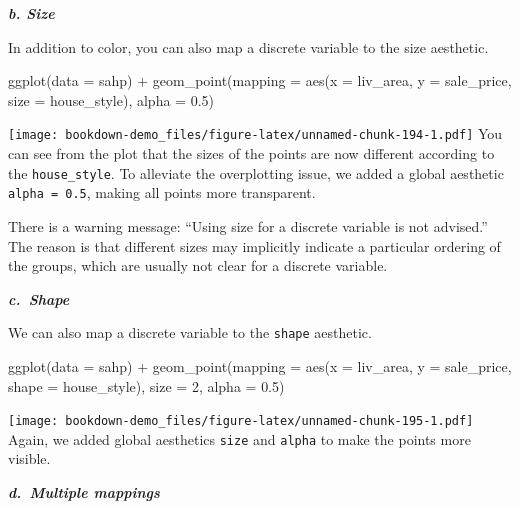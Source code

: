 \documentclass[
]{book}
\newenvironment{Shaded}{\begin{snugshade}}{\end{snugshade}}
\newcommand{\AttributeTok}[1]{\textcolor[rgb]{0.77,0.63,0.00}{#1}}
\newcommand{\DecValTok}[1]{\textcolor[rgb]{0.00,0.00,0.81}{#1}}
\newcommand{\FloatTok}[1]{\textcolor[rgb]{0.00,0.00,0.81}{#1}}
\newcommand{\FunctionTok}[1]{\textcolor[rgb]{0.00,0.00,0.00}{#1}}
\newcommand{\NormalTok}[1]{#1}
\newcommand{\SpecialCharTok}[1]{\textcolor[rgb]{0.00,0.00,0.00}{#1}}
\begin{document}
\textbf{\emph{b. Size}}

In addition to color, you can also map a discrete variable to the size aesthetic.

\begin{Shaded}
\begin{Highlighting}[]
\FunctionTok{ggplot}\NormalTok{(}\AttributeTok{data =}\NormalTok{ sahp) }\SpecialCharTok{+} \FunctionTok{geom\_point}\NormalTok{(}\AttributeTok{mapping =} \FunctionTok{aes}\NormalTok{(}\AttributeTok{x =}\NormalTok{ liv\_area, }\AttributeTok{y =}\NormalTok{ sale\_price, }\AttributeTok{size =}\NormalTok{ house\_style), }\AttributeTok{alpha =} \FloatTok{0.5}\NormalTok{)}
\end{Highlighting}
\end{Shaded}

\texttt{[image: bookdown-demo\_files/figure-latex/unnamed-chunk-194-1.pdf]}
You can see from the plot that the sizes of the points are now different according to the \texttt{house\_style}. To alleviate the overplotting issue, we added a global aesthetic \texttt{alpha\ =\ 0.5}, making all points more transparent.

There is a warning message: ``Using size for a discrete variable is not advised.'' The reason is that different sizes may implicitly indicate a particular ordering of the groups, which are usually not clear for a discrete variable.

\textbf{\emph{c.~Shape}}

We can also map a discrete variable to the \texttt{shape} aesthetic.

\begin{Shaded}
\begin{Highlighting}[]
\FunctionTok{ggplot}\NormalTok{(}\AttributeTok{data =}\NormalTok{ sahp) }\SpecialCharTok{+} \FunctionTok{geom\_point}\NormalTok{(}\AttributeTok{mapping =} \FunctionTok{aes}\NormalTok{(}\AttributeTok{x =}\NormalTok{ liv\_area, }\AttributeTok{y =}\NormalTok{ sale\_price, }\AttributeTok{shape =}\NormalTok{ house\_style), }\AttributeTok{size =} \DecValTok{2}\NormalTok{, }\AttributeTok{alpha =} \FloatTok{0.5}\NormalTok{)}
\end{Highlighting}
\end{Shaded}

\texttt{[image: bookdown-demo\_files/figure-latex/unnamed-chunk-195-1.pdf]}
Again, we added global aesthetics \texttt{size} and \texttt{alpha} to make the points more visible.

\textbf{\emph{d.~Multiple mappings}}
\end{document}
